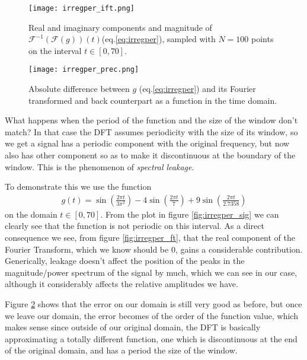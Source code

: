 \documentclass[10pt,a4paper,twocolumn]{article}
\begin{document}
\begin{figure}
\centering
\captionsetup{justification=centering}
\texttt{[image: irregper\_ift.png]}
\caption{Real and imaginary components and magnitude of $\mathcal{F}^{-1} \left( \mathcal{F} \left( g \right) \right)(t)$(eq.\ref{eq:irregper}), sampled with $N=100$ points on the interval $t \in [0,70]$.}
\label{fig:irregper_ift}
\end{figure}

\begin{figure}
\centering
\captionsetup{justification=centering}
\texttt{[image: irregper\_prec.png]}
\caption{Absolute difference between $g$ (eq.\ref{eq:irregper}) and its Fourier transformed and back counterpart as a function in the time domain.}
\label{fig:irregper_prec}
\end{figure}

What happens when the period of the function and the size of the window don't match? In that case the DFT assumes periodicity with the size of its window, so we get a signal has a periodic component with the original frequency, but now also has other component so as to make it discontinuous at the boundary of the window. This is the phenomenon of \emph{spectral leakage}. \cite{leakage}

To demonstrate this we use the function
%
\begin{align}\label{eq:irregper}
g(t) = \sin \left( \frac{2 \pi t}{3 \pi^2} \right) - 4 \sin \left( \frac{2 \pi t}{7} \right) + 9 \sin \left( \frac{2 \pi t}{2.7358} \right)
\end{align}
%
on the domain $t \in [0, 70]$. From the plot in figure \ref{fig:irregper_sig} we can clearly see that the function is not periodic on this interval. As a direct consequence we see, from figure \ref{fig:irregper_ft}, that the real component of the Fourier Transform, which we know should be $0$, gains a considerable contribution. Generically, leakage doesn't affect the position of the peaks in the magnitude/power spectrum of the signal by much, which we can see in our case, although it considerably affects the relative amplitudes we have.

Figure \ref{fig:irregper_prec} shows that the error on our domain is still very good as before, but once we leave our domain, the error becomes of the order of the function value, which makes sense since outside of our original domain, the DFT is basically approximating a totally different function, one which is discontinuous at the end of the original domain, and has a period the size of the window.
\end{document}
